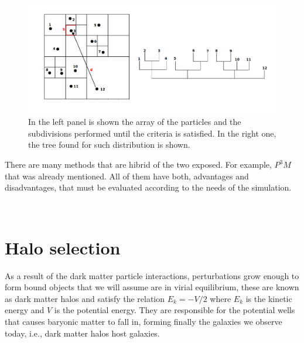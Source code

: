 \begin{enumerate}
\begin{figure}[htbp]
       \centering
               \includegraphics[width=1.0\textwidth]{Images/chapter3/treecode.png}
       \caption{\small In the left panel is shown the array of the particles and the subdivisions performed until the criteria \label{sq} is satisfied. In the right one, the tree found for such distribution is shown.}
       \label{tree}
 \end{figure}

\end{enumerate}

There are many methods that are hibrid of the two exposed. For example, 
$P^3M$ that was already mentioned. All of them have both, advantages and disadvantages,
that must be evaluated according to the needs of the simulation. 

\

\section{ Halo selection }

As a result of the dark matter particle interactions, perturbations 
grow enough to form bound objects that we will assume are in virial equilibrium,
these are known as dark matter halos and satisfy the relation $E_k=-V/2$ where
$E_k$ is the kinetic energy and $V$ is the potential energy. 
They are responsible for the potential wells that causes baryonic matter 
to fall in, forming finally the galaxies we observe today, i.e., dark
matter halos host galaxies. 

